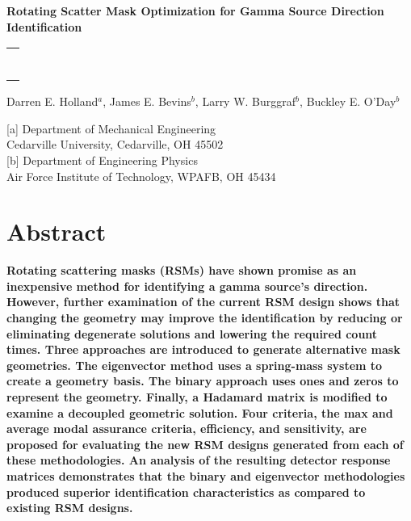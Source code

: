 \documentclass[twocolumn,10pt,final]{asme2ej}
\begin{document}
\begin{center}

\textbf{\large{Rotating Scatter Mask Optimization for Gamma Source Direction Identification}}

\noindent
\begin{tabular}{l}
\rule{3.2in}{0.02in}
\end{tabular}

{Darren E. Holland$^a$, James E. Bevins$^b$, Larry W. Burggraf$^b$, Buckley E. O'Day$^b$}
\vspace{0.1in}

{[a] Department of Mechanical Engineering\\
	Cedarville University, Cedarville, OH 45502\\}
{[b] Department of Engineering Physics\\
	Air Force Institute of Technology,	WPAFB, OH 45434\\}

\end{center}

\vspace{-0.4 cm}
\section*{Abstract}
\textbf{
Rotating scattering masks (RSMs) have shown promise as an inexpensive method for identifying a gamma source's direction.  
However, further examination of the current RSM design shows that changing the geometry may improve the identification by 
reducing or eliminating degenerate solutions and lowering the required count times.  
Three approaches are introduced to generate alternative mask geometries.
The eigenvector method uses a spring-mass system to create a geometry basis.  The binary approach uses ones and zeros to represent the geometry.  
Finally, a Hadamard matrix is modified to examine a decoupled geometric solution.   
Four criteria, the max and average modal assurance criteria, efficiency, and sensitivity, are proposed for evaluating the new RSM designs generated from each of these methodologies.
An analysis of the resulting detector response matrices demonstrates that the binary and eigenvector methodologies produced 
superior identification characteristics as compared to existing RSM designs.}

\vspace{-0.3 cm}
\end{document}
